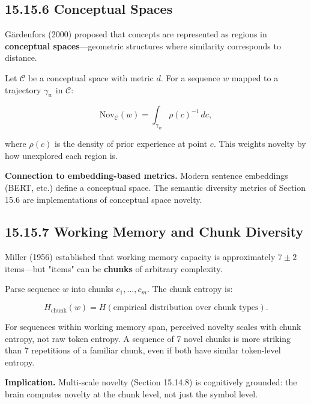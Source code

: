\subsection{15.15.6 Conceptual Spaces}

Gärdenfors (2000) proposed that concepts are represented as regions in \textbf{conceptual spaces}---geometric structures where similarity corresponds to distance.

\begin{definition}
Let $\mathcal{C}$ be a conceptual space with metric $d$. For a sequence $w$ mapped to a trajectory $\gamma_w$ in $\mathcal{C}$:

\[\mathrm{Nov}_{\mathcal{C}}(w) = \int_{\gamma_w} \rho(c)^{-1} \, dc,\]

where $\rho(c)$ is the density of prior experience at point $c$. This weights novelty by how unexplored each region is.

\textbf{Connection to embedding-based metrics.} Modern sentence embeddings (BERT, etc.) define a conceptual space. The semantic diversity metrics of Section 15.6 are implementations of conceptual space novelty.
\end{definition}

\subsection{15.15.7 Working Memory and Chunk Diversity}

Miller (1956) established that working memory capacity is approximately $7 \pm 2$ items---but "items" can be \textbf{chunks} of arbitrary complexity.

\begin{definition}
Parse sequence $w$ into chunks $c_1, \ldots, c_m$. The chunk entropy is:

\[H_{\mathrm{chunk}}(w) = H(\text{empirical distribution over chunk types}).\]
\end{definition}

\begin{proposition}
For sequences within working memory span, perceived novelty scales with chunk entropy, not raw token entropy. A sequence of 7 novel chunks is more striking than 7 repetitions of a familiar chunk, even if both have similar token-level entropy.

\textbf{Implication.} Multi-scale novelty (Section 15.14.8) is cognitively grounded: the brain computes novelty at the chunk level, not just the symbol level.
\end{proposition}

